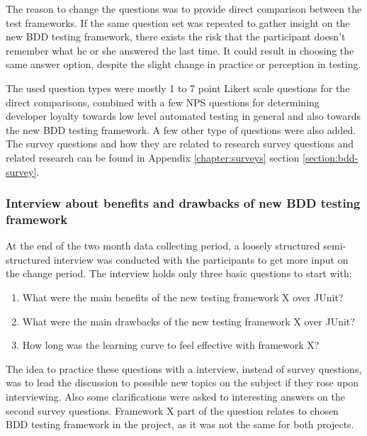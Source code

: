     The reason to change the questions was to provide direct comparison between the test frameworks.
    If the same question set was repeated to gather insight on the new BDD testing framework, there exists the risk that
    the participant doesn't remember what he or she answered the last time. It could result in choosing the same answer option,
    despite the slight change in practice or perception in testing.

    The used question types were mostly 1 to 7 point Likert scale questions for the direct comparisons, combined with a few NPS questions for
    determining developer loyalty towards low level automated testing in general and also towards the new BDD testing framework.
    A few other type of questions were also added.
    The survey questions and how they are related to research survey questions and related research can be found
    in Appendix \ref{chapter:surveys} section \ref{section:bdd-survey}.

    \subsubsection{Interview about benefits and drawbacks of new BDD testing framework}
    At the end of the two month data collecting period, a loosely structured semi-structured interview was conducted with the participants
    to get more input on the change period. The interview holds only three basic questions to start with:
    \begin{enumerate}
    \item What were the main benefits of the new testing framework X over JUnit?
    \item What were the main drawbacks of the new testing framework X over JUnit?
    \item How long was the learning curve to feel effective with framework X?
    \end{enumerate}
    The idea to practice these questions with a interview, instead of survey questions, was to lead the discussion
    to possible new topics on the subject if they rose upon interviewing. Also some clarifications were asked to interesting
    answers on the second survey questions. Framework X part of the question relates
    to chosen BDD testing framework in the project, as it was not the same for both projects.

